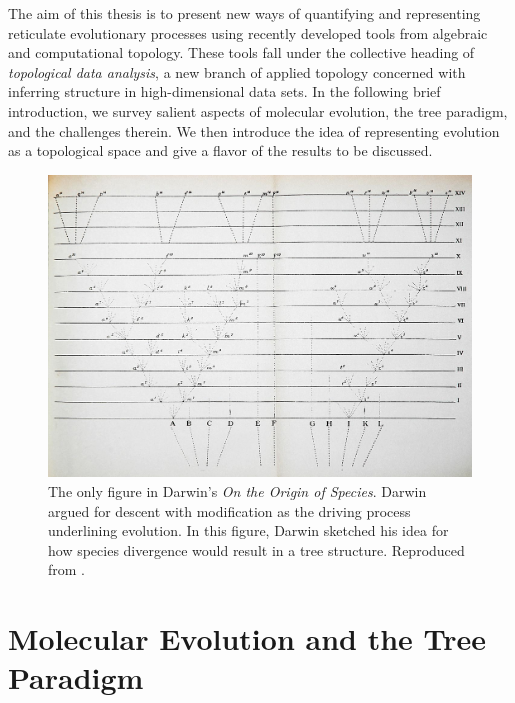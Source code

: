 The aim of this thesis is to present new ways of quantifying and representing reticulate evolutionary processes using recently developed tools from algebraic and computational topology.
These tools fall under the collective heading of \emph{topological data analysis}, a new branch of applied topology concerned with inferring structure in high-dimensional data sets.
In the following brief introduction, we survey salient aspects of molecular evolution, the tree paradigm, and the challenges therein.
We then introduce the idea of representing evolution as a topological space and give a flavor of the results to be discussed.

\begin{figure}
\centering
\includegraphics[width=.5\columnwidth]{./fig/introduction/Darwin_divergence.jpg}
\caption[Charles Darwin's Evolutionary Tree]{The only figure in Darwin's \emph{On the Origin of Species}. Darwin argued for descent with modification as the driving process underlining evolution. In this figure, Darwin sketched his idea for how species divergence would result in a tree structure. Reproduced from \cite{Darwin:1859uh}.}
\label{fig:darwin_origin}
\end{figure}

\section{Molecular Evolution and the Tree Paradigm}

